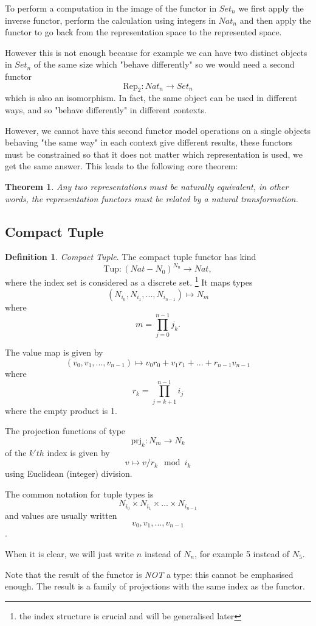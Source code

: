 \documentclass[oneside]{book}
\theoremstyle{plain}
\theoremstyle{definition}
\newtheorem{definition}{Definition}
\theoremstyle{plain}
\newtheorem{theorem}{Theorem}
\def\Set{\mathit{Set}}
\def\Nat{\mathit{Nat}}
\begin{document}
To perform a computation in the image of the functor in $\Set_n$ 
we first apply the inverse functor, perform the calculation using integers in $\Nat_n$
and then apply the functor to go back from the representation space to the represented space.

However this is not enough because for example we can have two distinct objects in $\Set_n$
of the same size which "behave differently" so we would need a second functor 
\begin{equation}
\mathrm{Rep_2}: \Nat_n\rightarrow \Set_n
\end{equation}
which is also an isomorphism. In fact, the same object can be used in different ways,
and so "behave differently" in different contexts.

However, we cannot have this second functor model operations on a single objects
behaving "the same way" in each context give different results, these functors
must be constrained so that it does not matter which representation is used, 
we get the same answer. This leads to the following core theorem:
\begin{theorem}
Any two representations must be naturally equivalent, in other words,
the representation functors must be related by a natural transformation.
\end{theorem}



\subsection{Compact Tuple}
\begin{definition} {\em Compact Tuple}.
The compact tuple functor has kind 
$$\mathrm{Tup}: (Nat-N_0)^{\mathit{N_n}}\rightarrow \Nat,$$
where the index set is considered as a discrete set.
\footnote{the index structure is crucial and will be generalised later} 
It maps types
$$(N_{i_0}, N_{i_1}, ... , N_{i_{n-1}}) \mapsto N_m$$
where 
$$m=\prod_{j=0}^{n-1}j_k.$$ 

The value map is given by
$$(v_0, v_1, ... ,v_{n-1}) \mapsto
v_0  r_0 + v_1  r_1 + ... + r_{n-1}  v_{n-1}$$
where
$$r_k = \prod_{j=k+1}^{n-1}i_j$$
where the empty product is 1.
 
The projection functions of type 
$$\mathrm{prj}_k: N_m\rightarrow N_k$$
of the $k'th$ index is given by 
$$v \mapsto v / r_k \mod i_k$$
using Euclidean (integer) division.

The common notation for tuple types is
$$N_{i_0} \times N_{i_1} \times ... \times N_{i_{n-1}}$$
and values are usually written
$$v_0, v_1, ... ,v_{n-1}$$.

When it is clear, we will just write $n$ instead of $N_n$, for
example 5 instead of $N_5$.

Note that the result of the functor is {\em NOT} a type: this cannot be
emphasised enough. The result is a family of projections with the
same index as the functor.
\end{definition}
\end{document}
